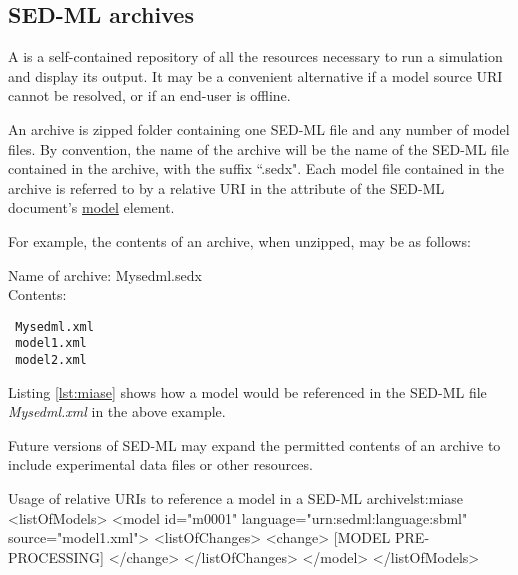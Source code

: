 \subsection{SED-ML archives}
\label{sec:archive} 
A  is a self-contained repository of all the resources necessary to run a simulation and display its output. It may be a convenient alternative if a model  source URI cannot be resolved,  or if an end-user is offline. 

An archive is zipped folder containing one SED-ML file and any number of model files. By convention,
 the name of the archive will be the name of the SED-ML file contained in the archive, with the suffix ``.sedx". Each model file contained in the archive is  referred to  by a relative URI  in the  attribute of the SED-ML document's  \hyperref[class:model]{model} element.
 
 For example, the contents of  an archive, when unzipped, may be as follows:
 
 Name of archive: Mysedml.sedx\\
 Contents: 
 \begin{verbatim}
 Mysedml.xml
 model1.xml
 model2.xml
 \end{verbatim}
 Listing \ref{lst:miase} shows how a model would be referenced in the SED-ML file \emph{Mysedml.xml} in the above example.
 
 Future versions of SED-ML may expand the permitted contents of an archive to include experimental data files or other resources.
%
\begin{myXmlLst}{Usage of relative URIs to reference a model in a SED-ML archive}{lst:miase}
<listOfModels>
 <model id="m0001" language="urn:sedml:language:sbml" 
  source="model1.xml">
  <listOfChanges>
   <change>
    [MODEL PRE-PROCESSING]
   </change>
   </listOfChanges> 
 </model>
</listOfModels>
\end{myXmlLst} 
%




